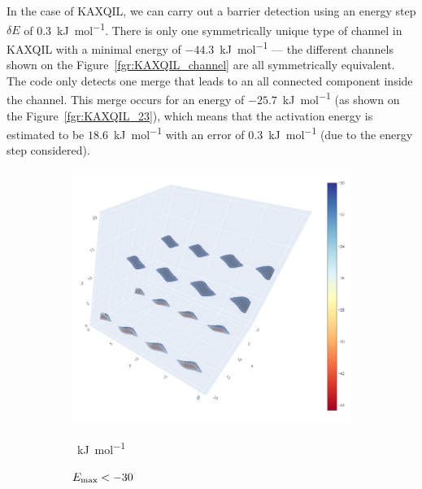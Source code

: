 \documentclass[main]{subfiles}
\begin{document}
In the case of KAXQIL, we can carry out a barrier detection using an energy step $\delta E$ of \SI{0.3}{\kJ\per\mol}. There is only one symmetrically unique type of channel in KAXQIL with a minimal energy of $-44.3$~\si{\kJ\per\mole} --- the different channels shown on the Figure~\ref{fgr:KAXQIL_channel} are all symmetrically equivalent. The code only detects one merge that leads to an all connected component inside the channel. This merge occurs for an energy of $-25.7$~\si{\kJ\per\mole} (as shown on the Figure~\ref{fgr:KAXQIL_23}), which means that the activation energy is estimated to be $18.6$~\si{\kJ\per\mole} with an error of \SI{0.3}{\kJ\per\mole} (due to the energy step considered). 

\begin{figure}[ht]
  \centering
  \begin{subfigure}[b]{0.3\textwidth}
    \centering
    \includegraphics[width=\textwidth]{figures/5-diffusion/KAXQIL_30.jpg}
    \caption{$E_{\text{max}}<-30$}~\si{\kJ\per\mole}\label{fgr:KAXQIL_30}
  \end{subfigure}
  \hfill
  \begin{subfigure}[b]{0.3\textwidth}
    \centering

\end{subfigure}
\end{figure}
\end{document}
